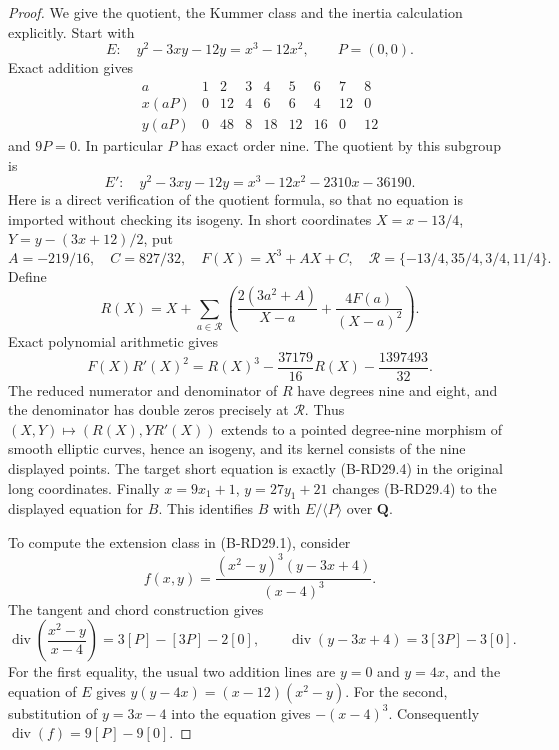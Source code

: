 \begin{proof}
We give the quotient, the Kummer class and the inertia calculation
explicitly. Start with
\[
 E:\quad y^2-3xy-12y=x^3-12x^2,
 \qquad P=(0,0).
\]
Exact addition gives
\[
 \begin{array}{c|rrrrrrrr}
 a&1&2&3&4&5&6&7&8\\\hline
 x(aP)&0&12&4&6&6&4&12&0\\
 y(aP)&0&48&8&18&12&16&0&12
 \end{array}
\]
and $9P=0$. In particular $P$ has exact order nine.
The quotient by this subgroup is
\[
 E':\quad y^2-3xy-12y=x^3-12x^2-2310x-36190.
                                                        \tag{B-RD29.4}
\]
Here is a direct verification of the quotient formula, so that
no equation is imported without checking its isogeny. In short
coordinates $X=x-13/4$, $Y=y-(3x+12)/2$, put
\[
 A=-219/16,\quad C=827/32,\quad F(X)=X^3+AX+C,
 \quad\mathcal R=\{-13/4,35/4,3/4,11/4\}.
\]
Define
\[
 R(X)=X+\sum_{a\in\mathcal R}
   \left(\frac{2(3a^2+A)}{X-a}
              +\frac{4F(a)}{(X-a)^2}\right).
\]
Exact polynomial arithmetic gives
\[
 F(X)R'(X)^2=R(X)^3-\frac{37179}{16}R(X)
                         -\frac{1397493}{32}.
                                                        \tag{B-RD29.5}
\]
The reduced numerator and denominator of $R$ have degrees nine
and eight, and the denominator has double zeros precisely at
$\mathcal R$. Thus $(X,Y)\mapsto(R(X),YR'(X))$ extends to a
pointed degree-nine morphism of smooth elliptic curves, hence an
isogeny, and its kernel consists of the nine displayed points.
The target short equation is exactly (B-RD29.4) in the original
long coordinates. Finally $x=9x_1+1$, $y=27y_1+21$ changes
(B-RD29.4) to the displayed equation for $B$. This identifies
$B$ with $E/\langle P\rangle$ over $\mathbf Q$.

To compute the extension class in (B-RD29.1), consider
\[
 f(x,y)=\frac{(x^2-y)^3(y-3x+4)}{(x-4)^3}.
                                                        \tag{B-RD29.6}
\]
The tangent and chord construction gives
\[
 \operatorname{div}\left(\frac{x^2-y}{x-4}\right)
       =3[P]-[3P]-2[0],
 \qquad
 \operatorname{div}(y-3x+4)=3[3P]-3[0].
\]
For the first equality, the usual two addition lines are $y=0$
and $y=4x$, and the equation of $E$ gives
$y(y-4x)=(x-12)(x^2-y)$. For the second, substitution of
$y=3x-4$ into the equation gives $-(x-4)^3$.
Consequently $\operatorname{div}(f)=9[P]-9[0]$.


\end{proof}
